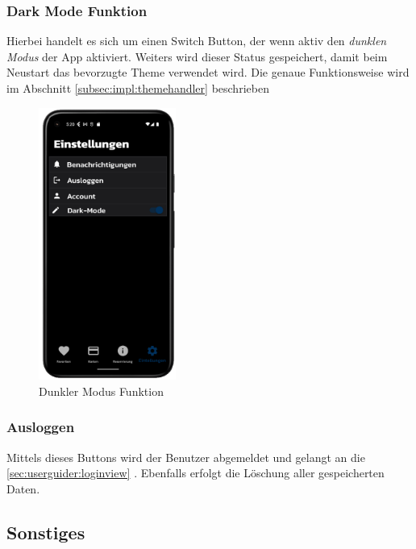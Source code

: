 \newpage

\subsubsection{Dark Mode Funktion}
Hierbei handelt es sich um einen Switch Button, der wenn aktiv den {\textit{dunklen Modus}} der App aktiviert. Weiters wird dieser Status gespeichert, damit beim Neustart das bevorzugte Theme verwendet wird. Die genaue Funktionsweise wird im Abschnitt \ref{subsec:impl:themehandler} beschrieben
\begin{figure}[!h]
\centering
\includegraphics[width=0.4\textwidth]{FLUTTER/images/GP/Dark_Mode.png}
\caption{Dunkler Modus Funktion}
\end{figure}

\newpage

\subsubsection{Ausloggen}
Mittels dieses Buttons wird der Benutzer abgemeldet und gelangt an die \ref{sec:userguider:loginview} . Ebenfalls erfolgt die Löschung aller gespeicherten Daten.

\subsection{Sonstiges}
